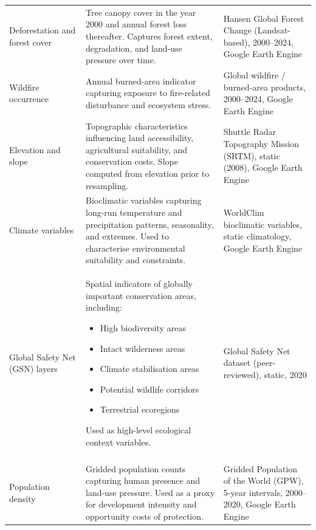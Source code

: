 \documentclass[12pt]{article}
\theoremstyle{break} %
\begin{document}
\begin{longtable}{%
  >{\raggedright\arraybackslash}p{0.25\linewidth}%
  >{\raggedright\arraybackslash}p{0.45\linewidth}%
  >{\raggedright\arraybackslash}p{0.30\linewidth}%
}
Deforestation and forest cover &
Tree canopy cover in the year 2000 and annual forest loss thereafter. Captures forest extent, degradation, and land-use pressure over time. &
Hansen Global Forest Change (Landsat-based), 2000--2024, Google Earth Engine \\

Wildfire occurrence &
Annual burned-area indicator capturing exposure to fire-related disturbance and ecosystem stress. &
Global wildfire / burned-area products, 2000--2024, Google Earth Engine \\

Elevation and slope &
Topographic characteristics influencing land accessibility, agricultural suitability, and conservation costs. Slope computed from elevation prior to resampling. &
Shuttle Radar Topography Mission (SRTM), static (2008), Google Earth Engine \\

Climate variables &
Bioclimatic variables capturing long-run temperature and precipitation patterns, seasonality, and extremes. Used to characterise environmental suitability and constraints. &
WorldClim bioclimatic variables, static climatology, Google Earth Engine \\

Global Safety Net (GSN) layers &
Spatial indicators of globally important conservation areas, including: \begin{itemize}
    \item High biodiversity areas
    \item Intact wilderness areas
    \item Climate stabilisation areas
    \item Potential wildlife corridors
    \item Terrestrial ecoregions
\end{itemize}
Used as high-level ecological context variables. &
Global Safety Net dataset (peer-reviewed), static, 2020 \\

\addlinespace\addlinespace

\multicolumn{3}{l}{\textbf{Human Pressure, Economic Activity, and Infrastructure}} \\
\addlinespace
Population density &
Gridded population counts capturing human presence and land-use pressure. Used as a proxy for development intensity and opportunity costs of protection. &
Gridded Population of the World (GPW), 5-year intervals, 2000--2020, Google Earth Engine \\


\end{longtable}
\end{document}
